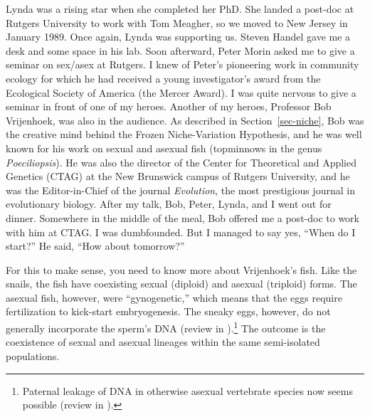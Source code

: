 \documentclass[
  american,
  letterpaper,
]{book}
\begin{document}
Lynda was a rising star when she completed her PhD. She landed a
post-doc at Rutgers University to work with Tom Meagher, so we moved to
New Jersey in January 1989. Once again, Lynda was supporting us. Steven
Handel gave me a desk and some space in his lab. Soon afterward, Peter
Morin asked me to give a seminar on sex/asex at Rutgers. I knew of
Peter's pioneering work in community ecology for which he had received a
young investigator's award from the Ecological Society of America (the
Mercer Award). I was quite nervous to give a seminar in front of one of
my heroes. Another of my heroes, Professor Bob Vrijenhoek, was also in
the audience. As described in Section~\ref{sec-niche}, Bob was the
creative mind behind the Frozen Niche-Variation Hypothesis, and he was
well known for his work on sexual and asexual fish (topminnows in the
genus \emph{Poeciliopsis}). He was also the director of the Center for
Theoretical and Applied Genetics (CTAG) at the New Brunswick campus of
Rutgers University, and he was the Editor-in-Chief of the journal
\emph{Evolution}, the most prestigious journal in evolutionary biology.
After my talk, Bob, Peter, Lynda, and I went out for dinner. Somewhere
in the middle of the meal, Bob offered me a post-doc to work with him at
CTAG. I was dumbfounded. But I managed to say yes, ``When do I start?''
He said, ``How about tomorrow?''

For this to make sense, you need to know more about Vrijenhoek's fish.
Like the snails, the fish have coexisting sexual (diploid) and asexual
(triploid) forms. The asexual fish, however, were ``gynogenetic,'' which
means that the eggs require fertilization to kick-start embryogenesis.
The sneaky eggs, however, do not generally incorporate the sperm's DNA
(review in ).\footnote{Paternal
  leakage of DNA in otherwise asexual vertebrate species now seems
  possible (review in ).} The outcome is the coexistence of sexual and asexual lineages
within the same semi-isolated populations.
\end{document}
